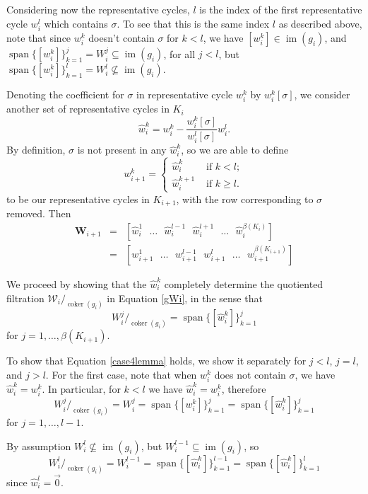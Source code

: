 \documentclass[12pt]{article}
\DeclareMathOperator{\coker}{coker}
\DeclareMathOperator{\im}{im}
\DeclareMathOperator{\spn}{span}
\begin{document}
Considering now the representative cycles, $l$ is the index of the first representative cycle $w_i^l$ which contains $\sigma$. To see that this is the same index $l$ as described above, note that since $w_i^k$ doesn't contain $\sigma$ for $k<l$, we have $[w_i^k] \in \im(g_i)$, and $\spn \{[w_i^k]\}_{k=1}^j = W_i^j \subseteq \im(g_i)$, for all $j < l$, but $\spn \{[w_i^k]\}_{k=1}^l = W_i^l \not\subseteq \im(g_i)$.

Denoting the coefficient for $\sigma$ in representative cycle $w_i^k$ by $w_i^k[\sigma]$, we consider another set of representative cycles in $K_i$
\[ \hat{w}_i^k = w_i^k - \frac{w_i^k[\sigma]}{w_i^l[\sigma]}w_i^l. \]
By definition, $\sigma$ is not present in any $\hat{w}_i^k$, so we are able to define
\[ w_{i+1}^k = \left\{ \begin{array}{ll}
                \hat{w}_i^k & \mbox{ if $k < l$};\\
                \hat{w}_i^{k+1} & \mbox{ if $k \geq l$}.\end{array} \right. \]
to be our representative cycles in $K_{i+1}$, with the row corresponding to $\sigma$ removed. Then
\begin{eqnarray*}
\mathbf{W}_{i+1} & = & [\hat{w}_i^1 \mbox{ } \ldots \mbox{ } \hat{w}_i^{l-1} \mbox{ } \hat{w}_i^{l+1} \mbox{ } \ldots \mbox{ } \hat{w}_i^{\beta(K_i)}] \\
& = & [w_{i+1}^1 \mbox{ } \ldots \mbox{ } w_{i+1}^{l-1} \mbox{ } w_{i+1}^l \mbox{ } \ldots \mbox{ } w_{i+1}^{\beta(K_{i+1})}]
\end{eqnarray*}

We proceed by showing that the $\hat{w}_i^k$ completely determine the quotiented filtration $\mathcal{W}_i/_{\coker(g_i)}$ in Equation \ref{gWi}, in the sense that
\begin{equation}\label{case4lemma}
W_i^j /_{\coker(g_i)} = \spn \{[\hat{w}_i^k]\}_{k=1}^j
\end{equation}
for $j = 1,\ldots,\beta(K_{i+1}).$



To show that Equation \ref{case4lemma} holds, we show it separately for $j<l$, $j=l$, and $j>l$. For the first case, note that when $w_i^k$ does not contain $\sigma$, we have $\hat{w}_i^k = w_i^k$. In particular, for $k<l$ we have $\hat{w}_i^k = w_i^k$, therefore
\[ W_i^j /_{\coker(g_i)} = W_i^j  = \spn \{[w_i^k]\}_{k=1}^j = \spn \{[\hat{w}_i^k]\}_{k=1}^j  \]
for $j = 1,\ldots, l-1$.

By assumption $W_i^l \not\subseteq \im(g_i)$, but $W_i^{l-1} \subseteq \im(g_i)$, so
\[ W_i^l/_{\coker(g_i)} = W_i^{l-1} = \spn \{[\hat{w}_i^k]\}_{k=1}^{l-1} = \spn \{[\hat{w}_i^k]\}_{k=1}^l \]
since $\hat{w}_i^l = \vec{0}$.
\end{document}
